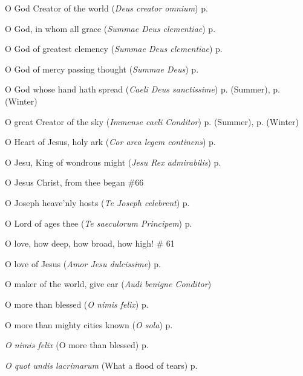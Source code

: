 \begin{hangparas}{1.25em}{1}
O God Creator of the world (\textit{Deus creator omnium}) \dotfill p. \pageref{WeekdayInvitatory}
\par\noindent
O God, in whom all grace (\textit{Summae Deus clementiae}) \dotfill p. \pageref{SevenSorrowsMattins}
\par\noindent
O God of greatest clemency (\textit{Summae Deus clementiae}) \dotfill p. \pageref{TrinityInvitatory}
\par\noindent
O God of mercy passing thought (\textit{Summae Deus}) \dotfill p. \pageref{SaturdayInvitatory}
\par\noindent
O God whose hand hath spread (\textit{Caeli Deus sanctissime}) \dotfill p. \pageref{WednesdayEvensongSummer} (Summer), p. \pageref{WednesdayEvensongWinter} (Winter)
\par\noindent
O great Creator of the sky (\textit{Immense caeli Conditor}) \dotfill p. \pageref{MondayEvensongSummer} (Summer), p. \pageref{MondayEvensongWinter} (Winter)
\par\noindent
O Heart of Jesus, holy ark (\textit{Cor arca legem continens}) \dotfill p. \pageref{CompassionMattins}
\par\noindent
O Jesu, King of wondrous might (\textit{Jesu Rex admirabilis}) \dotfill p. \pageref{HolyNameInvitatory}
\par\noindent
O Jesus Christ, from thee began \dotfill \#66
\par\noindent
O Joseph heave'nly hosts (\textit{Te Joseph celebrent}) \dotfill p. \pageref{JosephEvensong}
\par\noindent
O Lord of ages thee (\textit{Te saeculorum Principem}) \dotfill p. \pageref{ChristTheKingEvensong}
\par\noindent
O love, how deep, how broad, how high! \dotfill \# 61
\par\noindent
O love of Jesus (\textit{Amor Jesu dulcissime}) \dotfill p. \pageref{TransfigurationMattins}
\par\noindent
O maker of the world, give ear (\textit{Audi benigne Conditor}) 
\par\noindent
O more than blessed (\textit{O nimis felix}) \dotfill p. \pageref{JohnBaptistMattins}
\par\noindent
O more than mighty cities known (\textit{O sola}) \dotfill p. \pageref{EpiphanyMattins}
\par\noindent
\textit{O nimis felix} (O more than blessed) \dotfill p. \pageref{JohnBaptistMattins}
\par\noindent
\textit{O quot undis lacrimarum} (What a flood of tears) \dotfill p. \pageref{SevenSorrowsInvitatory}

\end{hangparas}
